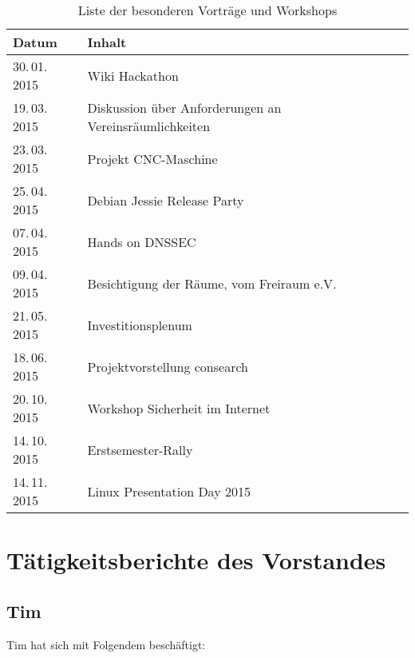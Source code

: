 \documentclass[ngerman]{scrartcl}
\begin{document}
\begin{table}[h]
  \centering{}
  \begin{tabularx}{\textwidth}{l|X}
	\textbf{Datum} & \textbf{Inhalt} \\ \midrule
	30.\,01.\,2015 & Wiki Hackathon \\
	19.\,03.\,2015 & Diskussion über Anforderungen an Vereinsräumlichkeiten \\
	23.\,03.\,2015 & Projekt CNC-Maschine \\
	25.\,04.\,2015 & Debian Jessie Release Party \\
        07.\,04.\,2015 & Hands on DNSSEC \\
	09.\,04.\,2015 & Besichtigung der Räume, vom Freiraum e.V. \\
	21.\,05.\,2015 & Investitionsplenum \\
	18.\,06.\,2015 & Projektvorstellung consearch \\
	20.\,10.\,2015 & Workshop Sicherheit im Internet \\
	14.\,10.\,2015 & Erstsemester-Rally \\
	14.\,11.\,2015 & Linux Presentation Day 2015 \\
\bottomrule
	\end{tabularx}
	\caption{Liste der besonderen Vorträge und Workshops}
\end{table}

\section{Tätigkeitsberichte des Vorstandes}

\subsection{Tim}

Tim hat sich mit Folgendem beschäftigt:
\end{document}
